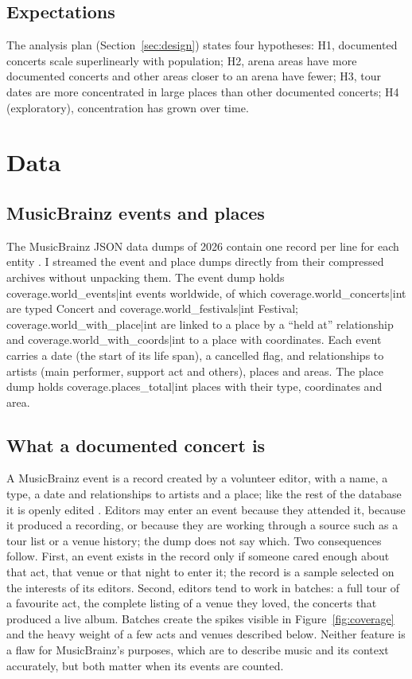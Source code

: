 \documentclass[11pt,a4paper]{article}
\begin{document}
\subsection{Expectations}
The analysis plan (Section~\ref{sec:design}) states four hypotheses: H1, documented concerts scale superlinearly with population; H2, arena areas have more documented concerts and other areas closer to an arena have fewer; H3, tour dates are more concentrated in large places than other documented concerts; H4 (exploratory), concentration has grown over time.

\section{Data}\label{sec:data}
\subsection{MusicBrainz events and places}
The MusicBrainz JSON data dumps of 2026 contain one record per line for each entity \citep{metabrainz2026}. I streamed the event and place dumps directly from their compressed archives without unpacking them. The event dump holds {{coverage.world_events|int}} events worldwide, of which {{coverage.world_concerts|int}} are typed Concert and {{coverage.world_festivals|int}} Festival; {{coverage.world_with_place|int}} are linked to a place by a ``held at'' relationship and {{coverage.world_with_coords|int}} to a place with coordinates. Each event carries a date (the start of its life span), a cancelled flag, and relationships to artists (main performer, support act and others), places and areas. The place dump holds {{coverage.places_total|int}} places with their type, coordinates and area.

\subsection{What a documented concert is}
A MusicBrainz event is a record created by a volunteer editor, with a name, a type, a date and relationships to artists and a place; like the rest of the database it is openly edited \citep{swartz2002,metabrainz2026}. Editors may enter an event because they attended it, because it produced a recording, or because they are working through a source such as a tour list or a venue history; the dump does not say which. Two consequences follow. First, an event exists in the record only if someone cared enough about that act, that venue or that night to enter it; the record is a sample selected on the interests of its editors. Second, editors tend to work in batches: a full tour of a favourite act, the complete listing of a venue they loved, the concerts that produced a live album. Batches create the spikes visible in Figure~\ref{fig:coverage} and the heavy weight of a few acts and venues described below. Neither feature is a flaw for MusicBrainz's purposes, which are to describe music and its context accurately, but both matter when its events are counted.
\end{document}
